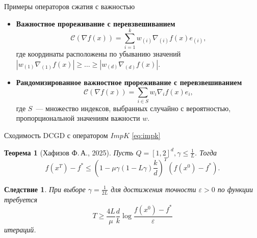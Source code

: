 \documentclass{beamer}
\newtheorem{mytheorem}{Теорема}
\newtheorem{mycorollary}{Следствие}
\begin{document}
\begin{frame}{Примеры операторов сжатия с важностью}
    \begin{itemize}
        \item \textbf{Важностное прореживание с перевзвешиванием}\\
        \begin{equation} \label{eq:impk}
            \mathcal{C}(\nabla f(x)) = \sum_{i=1}^k w_{(i)} \nabla_{(i)} f(x) e_{(i)},
        \end{equation}
        где координаты расположены по убыванию значений $|w_{(1)} \nabla_{(1)} f(x)| \geq \dots \geq |w_{(d)} \nabla_{(d)} f(x)|$.
        \item \textbf{Рандомизированное важностное прореживание с перевзвешиванием}\\
        \begin{equation}
            \mathcal{C}(\nabla f(x)) = \sum_{i \in S} w_i \nabla_i f(x) e_i,
        \end{equation}
        где $S$~--- множество индексов, выбранных случайно с вероятностью, пропорциональной значениям важности $w$.
    \end{itemize}
\end{frame}


\begin{frame}{Сходимость DCGD с оператором $ImpK$ \eqref{eq:impk}}
    \begin{mytheorem}[Хафизов Ф.\,А., 2025]
        Пусть $Q = [1, 2]^d, \gamma \leq \frac{1}{L}$. Тогда
        \begin{equation}
            f(x^T) - f^* \leq \left(1 - \mu \gamma \left(1 - L \gamma\right) \frac{k}{d} \right)^T (f(x^0) - f^*).
        \end{equation}
    \end{mytheorem}
    \begin{mycorollary}
        При выборе $\gamma = \frac{1}{2L}$ для достижения точности $\varepsilon > 0$ по функции требуется
        \begin{equation}
            T \geq \frac{4L}{\mu} \frac{d}{k} \log \frac{f(x^0) - f^*}{\varepsilon}
        \end{equation}
        итераций.
    \end{mycorollary}
\end{frame}
\end{document}
